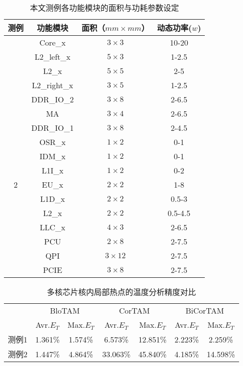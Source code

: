 \begin{table}
\centering
\caption{本文测例各功能模块的面积与功耗参数设定}
\begin{tabular}{c c c c}
\hline\hline
测例 & 功能模块 & 面积（$mm \times mm$） & 动态功率($w$) \\
\hline
 & Core\_x & $3\times 3$ & 10-20 \\
 & L2\_left\_x & $5\times 3$ & 1-2.5 \\
\raisebox{1.5ex}{1}
 & L2\_x & $5\times 5$ & 2-5 \\
 & L2\_right\_x & $3\times 5$ & 1-2.5 \\
\hline
 & DDR\_IO\_2 & $3 \times 8$ & 2-6.5 \\
 & MA & $3 \times 4$ & 2-6.5 \\
 & DDR\_IO\_1 & $3 \times 8$ & 2-4.5 \\
 & OSR\_x & $1 \times 2$ & 0-1 \\
 & IDM\_x & $1 \times 2$ & 0-1 \\
 & L1I\_x & $1 \times 2$ & 0-2 \\
2 & EU\_x & $2 \times 2$ & 1-8 \\
 & L1D\_x & $2 \times 2$ & 0.5-3 \\
 & L2\_x & $2 \times 2$ & 0.5-4.5 \\
 & LLC\_x & $4 \times 3$ & 2-6.5 \\
 & PCU & $2 \times 8$ & 2-7.5 \\
 & QPI & $3 \times 12$ & 2-7.5 \\
 & PCIE & $3 \times 8$ & 2-7.5 \\
\hline
\end{tabular}
\label{tab:chap5:exp-flp-parameters}
\end{table}


\begin{table}
\centering
\caption{多核芯片核内局部热点的温度分析精度对比}
\begin{tabular}{c c c c c c c}
\hline\hline
 & \multicolumn{2}{c}{BloTAM} & \multicolumn{2}{c}{CorTAM} & \multicolumn{2}{c}{BiCorTAM} \\
 & Avr.$E_T$ & Max.$E_T$ & Avr.$E_T$ & Max.$E_T$ & Avr.$E_T$ & Max.$E_T$ \\
 \hline
测例1 & 1.361\% & 1.574\% & 6.573\% & 12.851\% & 2.223\% & 2.259\% \\
\hline
测例2 & 1.447\% & 4.864\% & 33.063\% & 45.840\% & 4.185\% & 14.598\% \\
\hline
\end{tabular}
\label{tab:chap5:temp-error}
\end{table}

